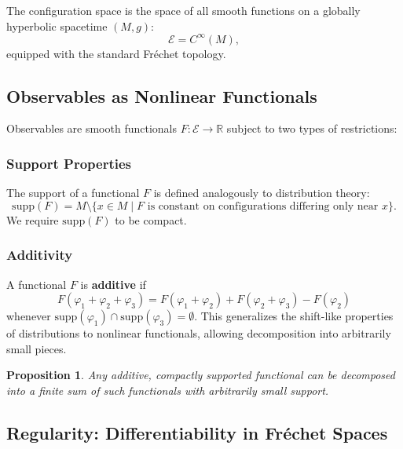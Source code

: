 \documentclass[11pt,a4paper]{article}
\newtheorem{proposition}{Proposition}[section]
\begin{document}
The configuration space is the space of all smooth functions on a globally
hyperbolic spacetime $(M, g)$:
\begin{equation}
  \mathcal{E} = C^\infty(M),
\end{equation}
equipped with the standard Fr\'echet topology.

\subsection{Observables as Nonlinear Functionals}

Observables are smooth functionals $F: \mathcal{E} \to \mathbb{R}$
subject to two types of restrictions:

\subsubsection{Support Properties}

The support of a functional $F$ is defined analogously to distribution theory:
\begin{equation}
  \mathrm{supp}(F) = M \setminus \{x \in M \mid F \text{ is constant
  on configurations differing only near } x\}.
\end{equation}
We require $\mathrm{supp}(F)$ to be compact.

\subsubsection{Additivity}

A functional $F$ is \textbf{additive} if
\begin{equation}
  F(\varphi_1 + \varphi_2 + \varphi_3) = F(\varphi_1 + \varphi_2)
  + F(\varphi_2 + \varphi_3) - F(\varphi_2)
\end{equation}
whenever $\mathrm{supp}(\varphi_1) \cap \mathrm{supp}(\varphi_3) = \emptyset$.
This generalizes the shift-like properties of distributions to nonlinear
functionals, allowing decomposition into arbitrarily small pieces.

\begin{proposition}
Any additive, compactly supported functional can be decomposed into a
\emph{finite sum} of such functionals with arbitrarily small support.
\end{proposition}

\subsection{Regularity: Differentiability in Fr\'echet Spaces}
\end{document}
